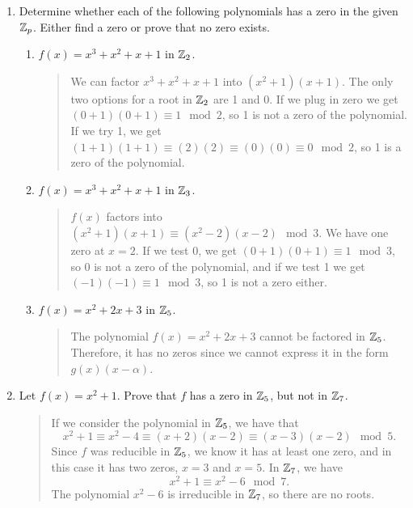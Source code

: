 \documentclass{hw}
\begin{document}

\begin{enumerate}
\item Determine whether each of the following polynomials has a zero in the given $\mathbb{Z}_{p}$. Either
find a zero or prove that no zero exists.
\begin{enumerate}
\item $f(x)=x^3+x^2+x+1$ in $\mathbb{Z}_{2}$.
\begin{quote}
We can factor $x^3+x^2+x+1$ into $(x^{2}+1)(x+1)$. The only two options for a root in $\mathbb{Z}_{2}$ are
1 and 0. If we plug in zero we get $(0+1)(0+1)\equiv1\mod2$, so 1 is not a zero of the polynomial.
If we try 1, we get $(1+1)(1+1)\equiv(2)(2)\equiv(0)(0)\equiv0\mod2$, so 1 is a zero of the
polynomial.
\end{quote}
\item $f(x)=x^3+x^2+x+1$ in $\mathbb{Z}_{3}$.
\begin{quote}
$f(x)$ factors into $(x^{2}+1)(x+1)\equiv(x^{2}-2)(x-2)\mod3$. We have one zero at $x=2$. If we test
0, we get $(0+1)(0+1)\equiv1\mod3$, so 0 is not a zero of the polynomial, and if we test 1 we get
$(-1)(-1)\equiv1\mod3$, so 1 is not a zero either.
\end{quote}
\item $f(x)=x^{2}+2x+3$ in $\mathbb{Z}_{5}$.
\begin{quote}
The polynomial $f(x)=x^{2}+2x+3$ cannot be factored in $\mathbb{Z}_{5}$. Therefore, it has no zeros since
we cannot express it in the form $g(x)(x-\alpha)$.
\end{quote}
\end{enumerate}

\item Let $f(x)=x^{2}+1$. Prove that $f$ has a zero in $\mathbb{Z}_{5}$, but not in $\mathbb{Z}_{7}$.
\begin{quote}
If we consider the polynomial in $\mathbb{Z}_{5}$, we have that
\[x^{2}+1\equiv x^{2}-4\equiv(x+2)(x-2)\equiv(x-3)(x-2)\mod5.\]
Since $f$ was reducible in $\mathbb{Z}_{5}$, we know it has at least one zero, and in this case it has
two zeros, $x=3$ and $x=5$. In $\mathbb{Z}_{7}$, we have
\[x^{2}+1\equiv x^{2}-6\mod7.\]
The polynomial $x^{2}-6$ is irreducible in $\mathbb{Z}_{7}$, so there are no roots.
\end{quote}


\end{enumerate}
\end{document}
